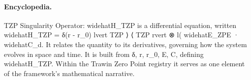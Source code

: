 \paragraph{Encyclopedia.}
TZP Singularity Operator: widehatH\_TZP is a differential equation, written widehatH\_TZP = δ(r - r\_0) lvert TZP ⟩ ⟨ TZP rvert ⊗ l( widehatE\_ZPE · widehatC\_d. It relates the quantity to its derivatives, governing how the system evolves in space and time. It is built from δ, r, r\_0, E, C, defining widehatH\_TZP. Within the Trawin Zero Point registry it serves as one element of the framework's mathematical narrative.
